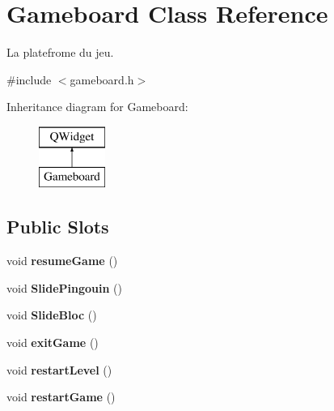 \hypertarget{class_gameboard}{}\section{Gameboard Class Reference}
\label{class_gameboard}


La platefrome du jeu.  




{\ttfamily \#include $<$gameboard.\+h$>$}

Inheritance diagram for Gameboard\+:\begin{figure}[H]
\begin{center}
\leavevmode
\includegraphics[height=2.000000cm]{class_gameboard}
\end{center}
\end{figure}
\subsection*{Public Slots}
\begin{DoxyCompactItemize}
\item 
\hypertarget{class_gameboard_a1447e62dd9f78bcba4bdb06c4bfb8f10}{}void {\bfseries resume\+Game} ()\label{class_gameboard_a1447e62dd9f78bcba4bdb06c4bfb8f10}

\item 
\hypertarget{class_gameboard_ac59525fc331dafd4a1a290593327aa7c}{}void {\bfseries Slide\+Pingouin} ()\label{class_gameboard_ac59525fc331dafd4a1a290593327aa7c}

\item 
\hypertarget{class_gameboard_aa4e9c04466f50e1590269eab05773581}{}void {\bfseries Slide\+Bloc} ()\label{class_gameboard_aa4e9c04466f50e1590269eab05773581}

\item 
\hypertarget{class_gameboard_af76ebc877764feed7bc9d90452178f5f}{}void {\bfseries exit\+Game} ()\label{class_gameboard_af76ebc877764feed7bc9d90452178f5f}

\item 
\hypertarget{class_gameboard_a0d4ac38611d2ed24732823656ba613e0}{}void {\bfseries restart\+Level} ()\label{class_gameboard_a0d4ac38611d2ed24732823656ba613e0}

\item 
\hypertarget{class_gameboard_a6286269cadea4a1171539b52431d56c5}{}void {\bfseries restart\+Game} ()\label{class_gameboard_a6286269cadea4a1171539b52431d56c5}

\end{DoxyCompactItemize}
